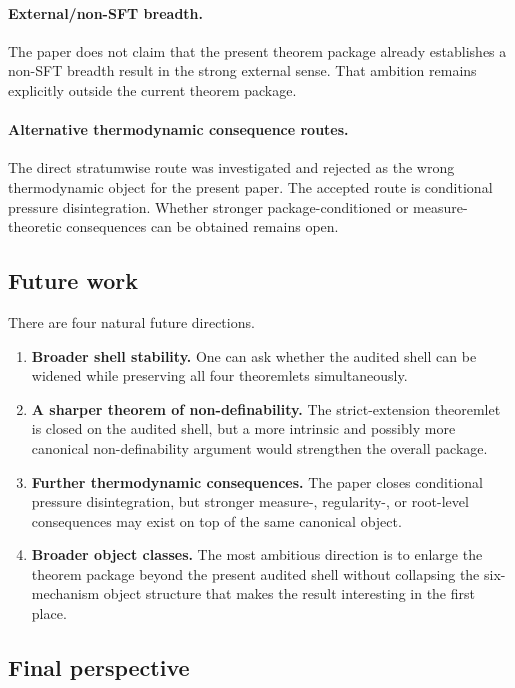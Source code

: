 \documentclass[11pt]{article}
\theoremstyle{definition}
\begin{document}
\paragraph{External/non-SFT breadth.}
The paper does not claim that the present theorem package already establishes a non-SFT breadth result in the strong external sense. That ambition remains explicitly outside the current theorem package.

\paragraph{Alternative thermodynamic consequence routes.}
The direct stratumwise route was investigated and rejected as the wrong thermodynamic object for the present paper. The accepted route is conditional pressure disintegration. Whether stronger package-conditioned or measure-theoretic consequences can be obtained remains open.

\subsection{Future work}

There are four natural future directions.

\begin{enumerate}
    \item \textbf{Broader shell stability.}
    One can ask whether the audited shell can be widened while preserving all four theoremlets simultaneously.

    \item \textbf{A sharper theorem of non-definability.}
    The strict-extension theoremlet is closed on the audited shell, but a more intrinsic and possibly more canonical non-definability argument would strengthen the overall package.

    \item \textbf{Further thermodynamic consequences.}
    The paper closes conditional pressure disintegration, but stronger measure-, regularity-, or root-level consequences may exist on top of the same canonical object.

    \item \textbf{Broader object classes.}
    The most ambitious direction is to enlarge the theorem package beyond the present audited shell without collapsing the six-mechanism object structure that makes the result interesting in the first place.
\end{enumerate}

\subsection{Final perspective}
\end{document}
